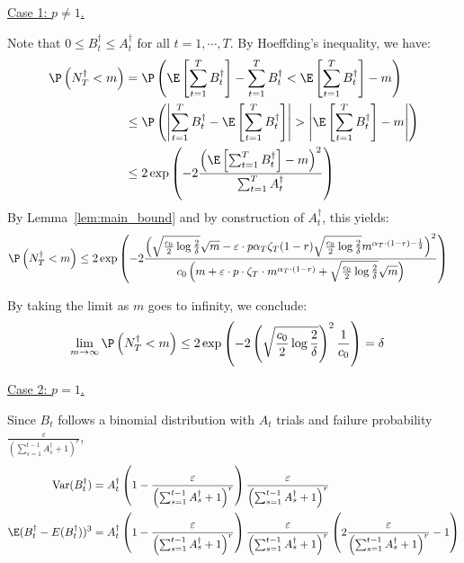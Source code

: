 \documentclass[blindrev]{informs3noheader}
\DeclareMathOperator{\Var}{Var}
\begin{document}
\underline{Case 1: $p\neq 1$.}

Note that $0\leq B^\dagger_t\leq A^\dagger_t$ for all $t=1,\cdots,T$. By Hoeffding's inequality, we have:
\begin{align*}
\P\left(N^\dagger_T<m\right)
&=\P\left(\E\left[\sum_{t=1}^T B^\dagger_t\right]-\sum_{t=1}^T B^\dagger_t < \E\left[\sum_{t=1}^T B^\dagger_t\right] - m\right)\\
&\leq\P\left(\left|\sum_{t=1}^T B^\dagger_t - \E\left[\sum_{t=1}^T B^\dagger_t\right]\right|>\left|\E\left[\sum_{t=1}^T B^\dagger_t\right]-m\right|\right)\\
&\leq2 \exp\left(-2\frac{\left(\E\left[\sum_{t=1}^T B^\dagger_t\right]-m\right)^2}{\sum_{t=1}^T A^\dagger_t}\right)
\end{align*}
By Lemma~\ref{lem:main_bound} and by construction of $A^\dagger_t$, this yields:
\begin{align*}
\P\left(N^\dagger_T<m\right)
&\leq 2 \exp\left(-2\frac{\left(\sqrt{\frac{c_0}{2}\log \frac{2}{\delta}}\sqrt{m} - \varepsilon\cdot p \alpha_T\zeta_T(1-r)\sqrt{\frac{c_0}{2}\log \frac{2}{\delta}}m^{\alpha_T\cdot (1-r)-\frac{1}{2}}\right)^2}{c_0\left(m+\varepsilon\cdot p \cdot \zeta_T \cdot m^{\alpha_T \cdot(1-r)}+ \sqrt{\frac{c_0}{2}\log \frac{2}{\delta}}\sqrt{m}\right)}\right)
\end{align*}

By taking the limit as $m$ goes to infinity, we conclude:
\begin{align*}
\lim_{m \to \infty}\P\left(N^\dagger_T<m\right)
&\leq 2 \exp\left(-2\left(\sqrt{\frac{c_0}{2}\log \frac{2}{\delta}}\right)^2\frac{1}{c_0}\right)
= \delta
\end{align*}

\underline{Case 2: $p=1$.}

Since $B_t$ follows a binomial distribution with $A_t$ trials and failure probability $\frac{\varepsilon}{\left(\sum_{s=1}^{t-1} A^\dagger_s +1\right)^r}$,
\begin{align*}
\Var(B^\dagger_t)&=A^\dagger_t \left(1 - \frac{\varepsilon}{\left(\sum_{s=1}^{t-1} A^\dagger_s +1\right)^r} \right) \frac{\varepsilon}{\left(\sum_{s=1}^{t-1} A^\dagger_s +1\right)^r}\\
\E(B^\dagger_t-E(B^\dagger_t))^3&=A^\dagger_t \left(1 - \frac{\varepsilon}{\left(\sum_{s=1}^{t-1} A^\dagger_s +1\right)^r} \right) \frac{\varepsilon}{\left(\sum_{s=1}^{t-1} A^\dagger_s +1\right)^r}\left(2\frac{\varepsilon}{\left(\sum_{s=1}^{t-1} A^\dagger_s +1\right)^r}-1\right)
\end{align*}
\end{document}
